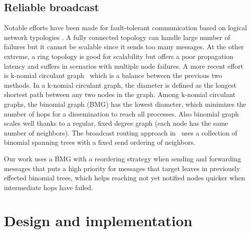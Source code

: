 \documentclass[sigconf]{acmart}
\begin{document}
\subsection{Reliable broadcast}
Notable efforts have been made for fault-tolerant communication based on logical network typologies \cite{Luo18}. A fully connected topology can handle large number of failures but it cannot be scalable since it sends too many messages. At the other extreme, a ring topology is good for scalability
but offers a poor propagation latency and suffers in scenarios with multiple node failures.
A more recent effort is k-nomial circulant graph~\cite{Angskun07, Pava11} which is a balance between the previous two methods. In a k-nomial circulant graph, the diameter is defined as the longest shortest path between any two nodes in the graph. Among k-nomial circulant graphs, the binomial graph (BMG) has the lowest diameter, which minimizes the number of hops for a dissemination to reach all 
processes. Also binomial graph scales well thanks to a regular, fixed degree graph (each node has the same number of neighbors). 
%
The broadcast routing approach in~\cite{Angskun07} uses a collection 
of binomial spanning trees with a fixed send ordering of neighbors. 

Our work uses a BMG with a reordering strategy when sending and forwarding messages that 
puts a high priority for messages that target leaves in previously effected 
binomial trees, which helps reaching not yet notified nodes quicker when intermediate 
hops have failed.
 
\section{Design and implementation}\label{sec:design}
\end{document}
